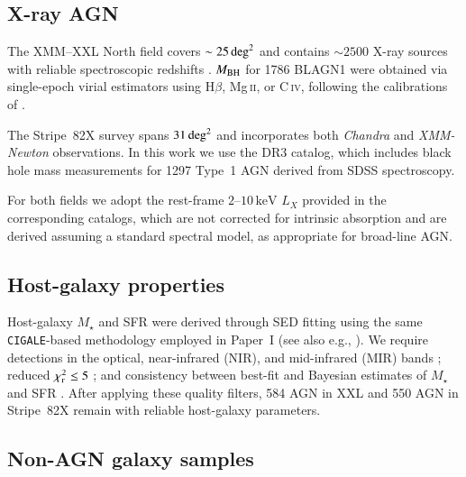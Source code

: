 \documentclass{aa}
\begin{document}
\subsection{X-ray AGN}
\label{sec_agn}

The XMM--XXL North field \citep{Pierre2016} covers $\sim25\,{\rm deg}^2$ and contains $\sim2500$ X-ray sources with reliable spectroscopic redshifts \citep{Menzel2016, Liu2016}.  
$M_{\rm BH}$ for 1786 BLAGN1 were obtained via single-epoch virial estimators using H$\beta$, Mg\,\textsc{ii}, or C\,\textsc{iv}, following the calibrations of \citet{Shen2011}.  

The Stripe~82X survey \citep{LaMassa2013a, LaMassa2013b, LaMassa2015, LaMassa2024} spans $31\,{\rm deg}^2$ and incorporates both \textit{Chandra} and \textit{XMM-Newton} observations.  
In this work we use the DR3 catalog, which includes black hole mass measurements for 1297 Type~1 AGN derived from SDSS spectroscopy.  

For both fields we adopt the rest-frame $2$--$10\,\mathrm{keV}$ $L_X$ provided in the corresponding catalogs, which are not corrected for intrinsic absorption and are derived assuming a standard spectral model, as appropriate for broad-line AGN.


\subsection{Host-galaxy properties}
\label{sec_sed}

Host-galaxy $M_\star$ and SFR were derived through SED fitting using the same \texttt{CIGALE}-based methodology \citep{Boquien2019, Yang2020, Yang2022} employed in Paper~I (see also e.g., \citealt{Mountrichas2021c, Mountrichas2022a, Mountrichas2023a, Mountrichas2023c, Mountrichas2024a, Mountrichas2024b}).  
We require detections in the optical, near-infrared (NIR), and mid-infrared (MIR) bands \citep[e.g.,][]{Mountrichas2022c, Mountrichas2024c, Mountrichas2024d}; reduced $\chi^2_{\rm r} \leq 5$ \citep[e.g.,][]{Masoura2018, Masoura2021, Buat2021}; and consistency between best-fit and Bayesian estimates of $M_\star$ and SFR \citep[e.g.][]{Mountrichas2021b, Mountrichas2022b, Pouliasis2022, Koutoulidis2022}.  
After applying these quality filters, 584 AGN in XXL and 550 AGN in Stripe~82X remain with reliable host-galaxy parameters.

\subsection{Non-AGN galaxy samples}
\label{sec_galaxies}
\end{document}
